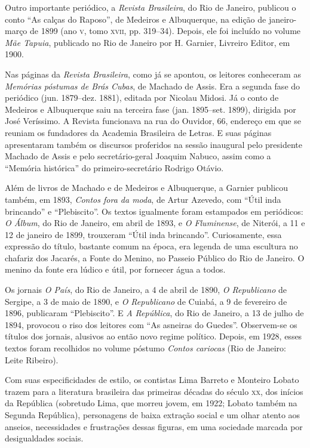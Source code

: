 Outro importante periódico, a \emph{Revista Brasileira}, do Rio de
Janeiro, publicou o conto ``As calças do Raposo'', de Medeiros e
Albuquerque, na edição de janeiro-março de 1899 (ano \textsc{v}, tomo \textsc{xvii}, pp.
319--34). Depois, ele foi incluído no volume \emph{Mãe Tapuia}, publicado
no Rio de Janeiro por H. Garnier, Livreiro Editor, em 1900.

Nas páginas da \emph{Revista Brasileira}, como já se apontou, os
leitores conheceram as \emph{Memórias póstumas de Brás Cubas}, de
Machado de Assis. Era a segunda fase do periódico (jun. 1879--dez. 1881),
editada por Nicolau Midosi. Já o conto de Medeiros e Albuquerque saiu na
terceira fase (jan. 1895--set. 1899), dirigida por José Veríssimo. A
Revista funcionava na rua do Ouvidor, 66, endereço em que se reuniam os
fundadores da Academia Brasileira de Letras. E suas páginas apresentaram
também os discursos proferidos na sessão inaugural pelo presidente
Machado de Assis e pelo secretário-geral Joaquim Nabuco, assim como a
``Memória histórica'' do primeiro-secretário Rodrigo Otávio.

Além de livros de Machado e de Medeiros e Albuquerque, a Garnier
publicou também, em 1893, \emph{Contos fora da moda}, de Artur Azevedo,
com ``Útil inda brincando'' e ``Plebiscito''. Os textos igualmente foram
estampados em periódicos: \emph{O Álbum}, do Rio de Janeiro, em abril de
1893, e \emph{O Fluminense}, de Niterói, a 11 e 12 de janeiro de 1899,
trouxeram ``Útil inda brincando''. Curiosamente, essa expressão do
título, bastante comum na época, era legenda de uma escultura no
chafariz dos Jacarés, a Fonte do Menino, no Passeio Público do Rio de
Janeiro. O menino da fonte era lúdico e útil, por fornecer água a todos.

Os jornais \emph{O País}, do Rio de Janeiro, a 4 de abril de 1890,
\emph{O Republicano} de Sergipe, a 3 de maio de 1890, e \emph{O
Republicano} de Cuiabá, a 9 de fevereiro de 1896, publicaram
``Plebiscito''. E \emph{A República}, do Rio de Janeiro, a 13 de julho
de 1894, provocou o riso dos leitores com ``As asneiras do Guedes''.
Observem-se os títulos dos jornais, alusivos ao então novo regime
político. Depois, em 1928, esses textos foram recolhidos no volume
póstumo \emph{Contos cariocas} (Rio de Janeiro: Leite Ribeiro).

Com suas especificidades de estilo, os contistas Lima Barreto e Monteiro
Lobato trazem para a literatura brasileira das primeiras décadas do
século \textsc{xx}, dos inícios da República (sobretudo Lima, que morreu jovem,
em 1922; Lobato também na Segunda República), personagens de baixa
extração social e um olhar atento aos anseios, necessidades e
frustrações dessas figuras, em uma sociedade marcada por desigualdades
sociais.

